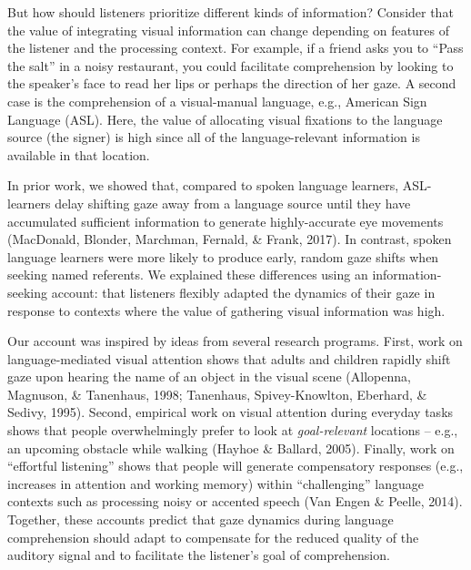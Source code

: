 \documentclass[10pt, letterpaper]{article}
\begin{document}
But how should listeners prioritize different kinds of information?
Consider that the value of integrating visual information can change
depending on features of the listener and the processing context. For
example, if a friend asks you to ``Pass the salt'' in a noisy
restaurant, you could facilitate comprehension by looking to the
speaker's face to read her lips or perhaps the direction of her gaze. A
second case is the comprehension of a visual-manual language, e.g.,
American Sign Language (ASL). Here, the value of allocating visual
fixations to the language source (the signer) is high since all of the
language-relevant information is available in that location.

In prior work, we showed that, compared to spoken language learners,
ASL-learners delay shifting gaze away from a language source until they
have accumulated sufficient information to generate highly-accurate eye
movements (MacDonald, Blonder, Marchman, Fernald, \& Frank, 2017). In
contrast, spoken language learners were more likely to produce early,
random gaze shifts when seeking named referents. We explained these
differences using an information-seeking account: that listeners
flexibly adapted the dynamics of their gaze in response to contexts
where the value of gathering visual information was high.

Our account was inspired by ideas from several research programs. First,
work on language-mediated visual attention shows that adults and
children rapidly shift gaze upon hearing the name of an object in the
visual scene (Allopenna, Magnuson, \& Tanenhaus, 1998; Tanenhaus,
Spivey-Knowlton, Eberhard, \& Sedivy, 1995). Second, empirical work on
visual attention during everyday tasks shows that people overwhelmingly
prefer to look at \emph{goal-relevant} locations -- e.g., an upcoming
obstacle while walking (Hayhoe \& Ballard, 2005). Finally, work on
``effortful listening'' shows that people will generate compensatory
responses (e.g., increases in attention and working memory) within
``challenging'' language contexts such as processing noisy or accented
speech (Van Engen \& Peelle, 2014). Together, these accounts predict
that gaze dynamics during language comprehension should adapt to
compensate for the reduced quality of the auditory signal and to
facilitate the listener's goal of comprehension.
\end{document}

